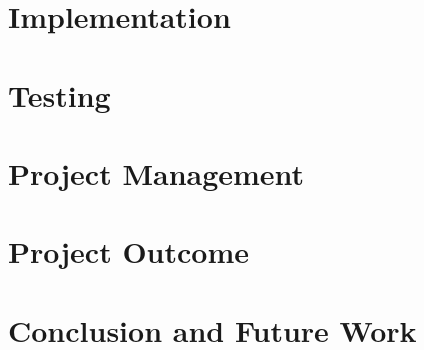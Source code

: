 \documentclass[12pt, a4paper, twoside]{book}
\begin{document}
\chapter{Implementation}
\label{chp:implementation}


%

\chapter{Testing}
\label{chp:testing}


\chapter{Project Management}
\label{chp:project_management}


\chapter{Project Outcome}
\label{chp:evaluation}


\chapter{Conclusion and Future Work}
\label{chp:conclusions_further_work}


\pagestyle{empty}

\appendix


\backmatter

\printbibliography
{}
\end{document}
